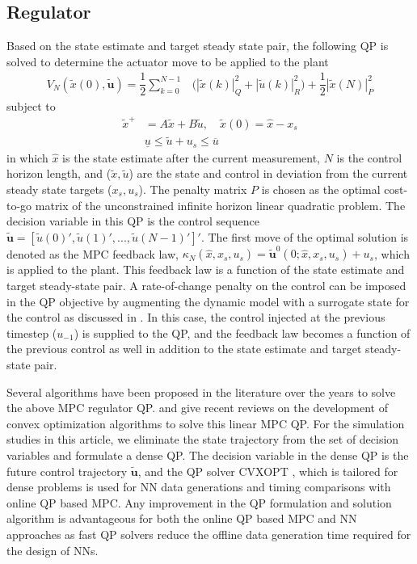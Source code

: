 \documentclass[preprint,5p, twocolumn, authoryear]{elsarticle}
\begin{document}
\subsection{Regulator}
Based on the state estimate and
target steady state pair,
the following QP is solved to determine the 
actuator move to be applied to the plant
\begin{align} \label{eqn:regulator}
    V_N(\tilde{x}(0), \mathbf{\tilde{u}}) = \dfrac{1}{2}\sum_{k=0}^{N-1} & \Big(|\tilde{x}(k)|^2_Q  + |\tilde{u}(k)|^2_R \Big) + \dfrac{1}{2}|\tilde{x}(N)|^2_P
\end{align}
subject to 
\begin{align}
    \tilde{x}^+ &= A\tilde{x} + B\tilde{u}, \quad \tilde{x}(0) = \hat{x} - x_s \\
    &\underline{u} \leq \tilde{u} + u_s \leq \overline{u}
    \label{eqn:regulator_constraints}
\end{align}
in which $\hat{x}$ is the state estimate after the current measurement,
$N$ is the control 
horizon length, and
($\tilde{x}, \tilde{u}$) are the state and control 
in deviation from the current steady state targets ($x_s, u_s$). 
The penalty matrix $P$ is chosen as the 
optimal cost-to-go matrix of the unconstrained infinite horizon 
linear quadratic problem.
The decision variable in this 
QP is the control sequence 
$\mathbf{\tilde{u}} = [\tilde{u}(0)', \tilde{u}(1)', ..., \tilde{u}(N-1)']'$.
The first move of the optimal solution is denoted 
as the MPC feedback law,
$\kappa_N(\hat{x}, x_s, u_s) = 
\mathbf{\tilde{u}}^0(0;\hat{x}, x_s, u_s) + u_s$, 
which is applied to the plant. This feedback law is a function of the 
state estimate and target steady-state pair. A rate-of-change 
penalty on the control can be imposed in the QP objective
by augmenting the dynamic model with a surrogate state 
for the control as discussed in \cite*{rao:rawlings:1999}. 
In this case, 
the control injected at the previous timestep
($u_{-1}$) is supplied to the QP, 
and the feedback law becomes a function of the previous control 
as well in addition to the state estimate
and target steady-state pair.

Several algorithms have been proposed in the literature over
the years to solve the above MPC regulator QP. 
\cite*{kouzoupis:frison:zanelli:diehl:2018} and
\cite*{wright:2019} give recent reviews on the development 
of convex optimization algorithms to solve this linear MPC QP.
For the simulation studies in this article, we eliminate the 
state trajectory from the set of decision variables  
and formulate a dense QP. The decision variable in the dense QP
is the future control trajectory $\mathbf{\tilde{u}}$, 
and the QP solver CVXOPT \citep*{vandenberghe:2010},
which is tailored for dense problems
is used for NN data generations and timing 
comparisons with online QP based MPC.
Any improvement in the QP formulation
and solution algorithm is advantageous
for both the online QP based MPC 
and NN approaches
as fast QP solvers reduce the 
offline data generation time required for the 
design of NNs.
\end{document}
